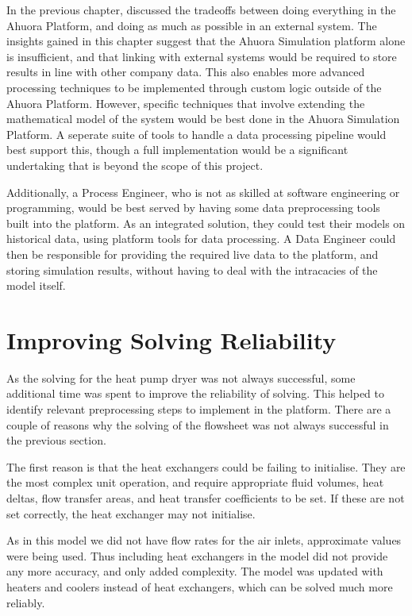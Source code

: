 In the previous chapter,  discussed the tradeoffs between doing everything in the Ahuora Platform, and doing as much as possible in an external system. The insights gained in this chapter suggest that the Ahuora Simulation platform alone is insufficient, and that linking with external systems would be required to store results in line with other company data. This also enables more advanced processing techniques to be implemented through custom logic outside of the Ahuora Platform. However, specific techniques that involve extending the mathematical model of the system would be best done in the Ahuora Simulation Platform. A seperate suite of tools to handle a data processing pipeline would best support this, though a full implementation would be a significant undertaking that is beyond the scope of this project. 

Additionally, a Process Engineer, who is not as skilled at software engineering or programming, would be best served by having some data preprocessing tools built into the platform. As an integrated solution, they could test their models on historical data, using platform tools for data processing. A Data Engineer could then be responsible for providing the required live data to the platform, and storing simulation results, without having to deal with the intracacies of the model itself.




\section{Improving Solving Reliability} \label{sec:solvingreliability}

As the solving for the heat pump dryer was not always successful, some additional time was spent to improve the reliability of solving.
This helped to identify relevant preprocessing steps to implement in the platform.
There are a couple of reasons why the solving of the flowsheet was not always successful in the previous section. 

The first reason is that the heat exchangers could be failing to initialise. They are the most complex unit operation, and require appropriate fluid volumes, heat deltas, flow transfer areas, and heat transfer coefficients to be set. If these are not set correctly, the heat exchanger may not initialise. 

As in this model we did not have flow rates for the air inlets, approximate values were being used. Thus including heat exchangers in the model did not provide any more accuracy, and only added complexity. The model was updated with heaters and coolers instead of heat exchangers, which can be solved much more reliably.

